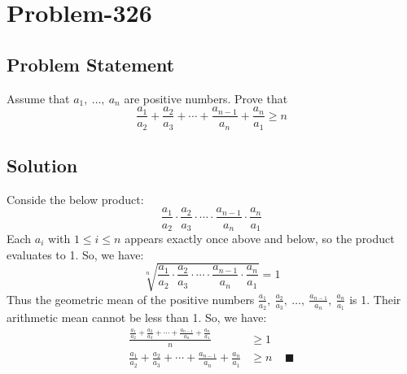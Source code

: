 \documentclass{article}
\begin{document}
\section*{Problem-326}
\subsection*{Problem Statement}
Assume that $a_1,\ \ldots,\ a_n$ are positive numbers. Prove that
\[
	\frac{a_1}{a_2} + \frac{a_2}{a_3} + \cdots + \frac{a_{n-1}}{a_n} + \frac{a_n}{a_1} \geq n
\]

\subsection*{Solution}
Conside the below product:
\[
	\frac{a_1}{a_2} \cdot \frac{a_2}{a_3} \cdot \cdots \cdot \frac{a_{n-1}}{a_n} \cdot \frac{a_n}{a_1}
\]
Each $a_i$ with $1 \leq i \leq n$ appears exactly once above and below, so the product evaluates to 1. So, we have:
\[
	\sqrt[n]{\frac{a_1}{a_2} \cdot \frac{a_2}{a_3} \cdot \cdots \cdot \frac{a_{n-1}}{a_n} \cdot \frac{a_n}{a_1}} = 1
\]
Thus the geometric mean of the positive numbers $\frac{a_1}{a_2},\ \frac{a_2}{a_3},\ \ldots,\ \frac{a_{n-1}}{a_n},\ \frac{a_n}{a_1}$ is 1. Their arithmetic mean cannot be less than 1. So, we have:
\begin{equation*}
	\begin{aligned}
		\frac{\frac{a_1}{a_2} + \frac{a_2}{a_3} + \cdots + \frac{a_{n-1}}{a_n} + \frac{a_n}{a_1}}{n} &\geq 1\\
		\frac{a_1}{a_2} + \frac{a_2}{a_3} + \cdots + \frac{a_{n-1}}{a_n} + \frac{a_n}{a_1} &\geq n\ \ \ \ \ \blacksquare
	\end{aligned}
\end{equation*}
\end{document}
